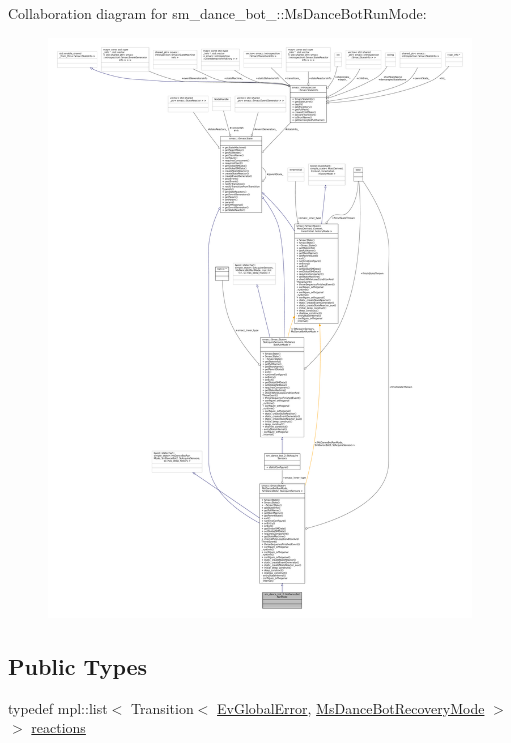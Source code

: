 Collaboration diagram for sm\+\_\+dance\+\_\+bot\+\_\+:\+:Ms\+Dance\+Bot\+Run\+Mode\+:
\nopagebreak
\begin{figure}[H]
\begin{center}
\leavevmode
\includegraphics[width=350pt]{classsm__dance__bot__2_1_1MsDanceBotRunMode__coll__graph}
\end{center}
\end{figure}
\subsection*{Public Types}
\begin{DoxyCompactItemize}
\item 
typedef mpl\+::list$<$ Transition$<$ \hyperlink{structsm__dance__bot__2_1_1EvGlobalError}{Ev\+Global\+Error}, \hyperlink{classsm__dance__bot__2_1_1MsDanceBotRecoveryMode}{Ms\+Dance\+Bot\+Recovery\+Mode} $>$ $>$ \hyperlink{classsm__dance__bot__2_1_1MsDanceBotRunMode_a66cf5d65e04e52d64e448310e4677ede}{reactions}
\end{DoxyCompactItemize}
